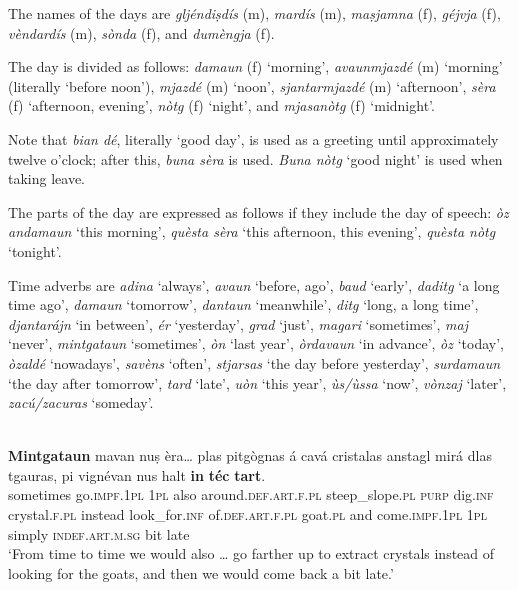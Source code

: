 The names of the days are \textit{gljéndiṣdís} (m), \textit{mardís} (m), \textit{maṣjamna} (f), \textit{géjvja} (f), \textit{vèndardís} (m), \textit{sònda} (f), and \textit{dumèngja} (f).

The day is divided as follows: \textit{damaun} (f) `morning', \textit{avaunmjazdé} (m) `morning' (literally `before noon'), \textit{mjazdé} (m) `noon', \textit{sjantarmjazdé} (m) `afternoon', \textit{sèra} (f) `afternoon, evening', \textit{nòtg} (f) `night', and \textit{mjasanòtg} (f) `midnight'.

Note that \textit{bian dé}, literally `good day', is used as a greeting until approximately twelve o'clock; after this, \textit{buna sèra} is used. \textit{Buna nòtg} `good night' is used when taking leave. 

The parts of the day are expressed as follows if they include the day of speech: \textit{òz andamaun} `this morning', \textit{quèsta sèra} `this afternoon, this evening', \textit{quèsta nòtg} `tonight'.

Time adverbs are \textit{adina} `always', \textit{avaun} `before, ago', \textit{baud} `early', \textit{daditg} `a long time ago', \textit{damaun} `tomorrow', \textit{dantaun} `meanwhile', \textit{ditg} `long, a long time', \textit{djantarájn} `in between', \textit{ér} `yesterday', \textit{grad} `just', \textit{magari} `sometimes', \textit{maj} `never', \textit{mintgataun} `sometimes', \textit{òn} `last year', \textit{òrdavaun} `in advance', \textit{òz} `today', \textit{òzaldé} `nowadays', \textit{savèns} `often', \textit{stjarsas} `the day before yesterday', \textit{surdamaun} `the day after tomorrow', \textit{tard} `late', \textit{uòn} `this year', \textit{ùs/ùssa} `now', \textit{vònzaj} `later', \textit{zacú/zacuras} `someday'.

\ea
\label{}
\\
\gll \textbf{Mintgataun} mavan nuṣ èra… plas pitgògnas á cavá cristalas anstagl mirá dlas tgauras, pi vignévan nus halt \textbf{in} \textbf{téc} \textbf{tart}. \\
sometimes go.\textsc{impf.1pl} \textsc{1pl} also around.\textsc{def.art.f.pl}  steep\_slope.\textsc{pl} \textsc{purp} dig.\textsc{inf} crystal.\textsc{f.pl} instead look\_for.\textsc{inf} of.\textsc{def.art.f.pl} goat.\textsc{pl} and come.\textsc{impf.1pl} \textsc{1pl} simply \textsc{indef.art.m.sg} bit late \\
\glt `From time to time we would also … go farther up to extract crystals instead of looking for the goats, and then we would come back a bit late.'
\z

